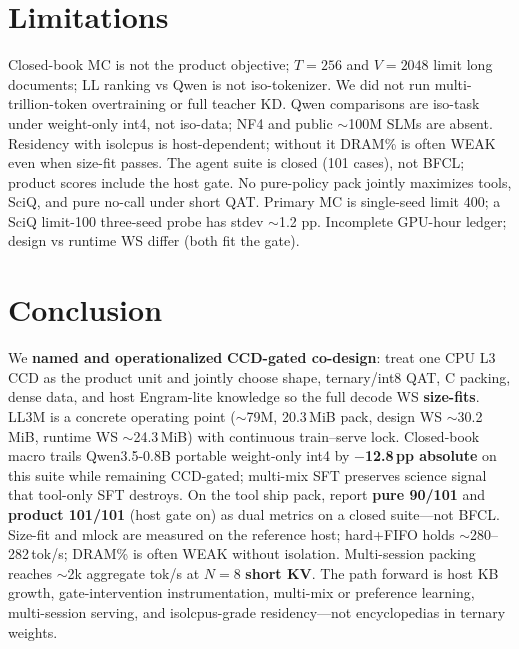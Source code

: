 \documentclass[11pt,a4paper]{article}
\begin{document}
\section{Limitations}
\label{sec:limits}

Closed-book MC is not the product objective; $T{=}256$ and $V{=}2048$ limit long documents; LL ranking vs Qwen is not iso-tokenizer.
We did not run multi-trillion-token overtraining or full teacher KD.
Qwen comparisons are iso-task under weight-only int4, not iso-data; NF4 and public $\sim$100M SLMs are absent.
Residency with isolcpus is host-dependent; without it DRAM\% is often WEAK even when size-fit passes.
The agent suite is closed (101 cases), not BFCL; product scores include the host gate.
No pure-policy pack jointly maximizes tools, SciQ, and pure no-call under short QAT.
Primary MC is single-seed limit 400; a SciQ limit-100 three-seed probe has stdev $\sim$1.2 pp. Incomplete GPU-hour ledger; design vs runtime WS differ (both fit the gate).

\FloatBarrier
\section{Conclusion}
\label{sec:conc}

We \textbf{named and operationalized} \textbf{CCD-gated co-design}: treat one CPU L3 CCD as the product unit and jointly choose shape, ternary/int8 QAT, C packing, dense data, and host Engram-lite knowledge so the full decode WS \textbf{size-fits}.
LL3M is a concrete operating point ($\sim$79M, 20.3\,MiB pack, design WS $\sim$30.2\,MiB, runtime WS $\sim$24.3\,MiB) with continuous train--serve lock.
Closed-book macro trails Qwen3.5-0.8B portable weight-only int4 by \textbf{$-$12.8\,pp absolute} on this suite while remaining CCD-gated; multi-mix SFT preserves science signal that tool-only SFT destroys.
On the tool ship pack, report \textbf{pure 90/101} and \textbf{product 101/101} (host gate on) as dual metrics on a closed suite---not BFCL.
Size-fit and mlock are measured on the reference host; hard+FIFO holds $\sim$280--282\,tok/s; DRAM\% is often WEAK without isolation.
Multi-session packing reaches $\sim$2k aggregate tok/s at $N{=}8$ \textbf{short KV}.
The path forward is host KB growth, gate-intervention instrumentation, multi-mix or preference learning, multi-session serving, and isolcpus-grade residency---not encyclopedias in ternary weights.
\end{document}
